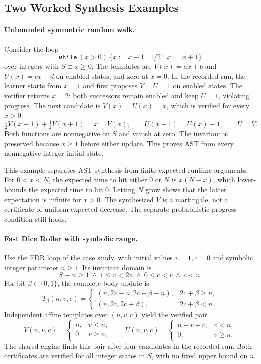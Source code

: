 \subsection{Two Worked Synthesis Examples}
\label{sec:synthesis-examples}

\paragraph{Unbounded symmetric random walk.}
Consider the loop
\[
 \mathtt{while}\ (x>0)\ \{x:=x-1\ [1/2]\ x:=x+1\}
\]
over integers with $S\equiv x\geq0$. The templates are $V(x)=ax+b$ and
$U(x)=cx+d$ on enabled states, and zero at $x=0$.
In the recorded run, the learner starts from $x=1$ and first proposes
$V=U=1$ on enabled states. The verifier returns $x=2$: both successors
remain enabled and keep $U=1$, violating progress.
The next candidate is $V(x)=U(x)=x$, which is verified for every $x>0$:
\[
 \tfrac12 V(x-1)+\tfrac12 V(x+1)=x=V(x),
 \qquad U(x-1)=U(x)-1,
 \qquad U=V.
\]
Both functions are nonnegative on $S$ and vanish at zero. The invariant
is preserved because $x\geq1$ before either update. This proves AST from
every nonnegative integer initial state.

This example separates AST synthesis from finite-expected-runtime
arguments. For $0<x<N$, the expected time to hit either $0$ or $N$ is
$x(N-x)$, which lower-bounds the expected time to hit $0$. Letting
$N$ grow shows that the latter expectation is infinite for $x>0$.
The synthesized $V$ is a martingale, not a certificate of uniform expected
decrease. The separate probabilistic progress condition still holds.

\paragraph{Fast Dice Roller with symbolic range.}
Use the FDR loop of the case study, with initial values $v=1,c=0$ and
symbolic integer parameter $n\geq1$. Its invariant domain is
\[
 S\equiv n\geq1\ \land\ 1\leq v<2n\ \land\ 0\leq c<v\ \land\ c<n.
\]
For bit $\beta\in\{0,1\}$, the complete body update is
\[
 T_\beta(n,v,c)=
 \begin{cases}
 (n,2v-n,2c+\beta-n),&2c+\beta\geq n,\\
 (n,2v,2c+\beta),&2c+\beta<n.
 \end{cases}
\]
Independent affine templates over $(n,v,c)$ yield the verified pair
\[
 V(n,v,c)=\begin{cases}n,&v<n,\\0,&v\geq n,\end{cases}
 \qquad
 U(n,v,c)=\begin{cases}n-v+c,&v<n,\\0,&v\geq n.\end{cases}
\]
The shared engine finds this pair after four candidates in the recorded
run. Both certificates are verified for all integer states in $S$, with
no fixed upper bound on $n$.

